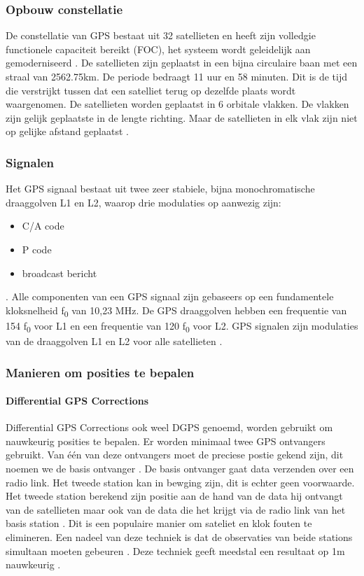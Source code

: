 \subsubsection{Opbouw constellatie}
 De constellatie van GPS bestaat uit 32 satellieten en heeft zijn volledgie functionele capaciteit bereikt (FOC), het systeem wordt geleidelijk aan gemoderniseerd \cite{LBibGNSS4}. De satellieten zijn geplaatst in een bijna circulaire baan met een straal van 2562.75km. De periode bedraagt 11 uur en 58 minuten. Dit is de tijd die verstrijkt tussen dat een satelliet terug op dezelfde plaats wordt waargenomen. De satellieten worden geplaatst in 6 orbitale vlakken. De vlakken zijn gelijk geplaatste in de lengte richting. Maar de satellieten in elk vlak zijn niet op gelijke afstand geplaatst \cite{LBibGNSS6}. 

\subsubsection{Signalen}
Het GPS signaal bestaat uit twee zeer stabiele, bijna monochromatische draaggolven L1 en L2, waarop drie modulaties op aanwezig zijn:
\begin{itemize}
	\item C/A code
	\item P code
	\item broadcast bericht
\end{itemize}. 
Alle componenten van een GPS signaal zijn gebaseers op een fundamentele kloksnelheid f\textsubscript{0} van 10,23 MHz. De GPS draaggolven hebben een frequentie van 154 f\textsubscript{0} voor L1 en een frequentie van 120 f\textsubscript{0} voor L2\cite{LBibGPS2}. GPS signalen zijn modulaties van de draaggolven L1 en L2 voor alle satellieten \cite{LBibGPS3}.

\subsubsection{Manieren om posities te bepalen}
\paragraph{Differential GPS Corrections}
Differential GPS Corrections ook weel DGPS genoemd, worden gebruikt om nauwkeurig posities  te bepalen. Er worden minimaal twee GPS ontvangers gebruikt. Van \'e\'en van deze ontvangers moet de preciese postie gekend zijn, dit noemen we de basis ontvanger \cite{LBibGNSS2,LBibRTK}. De basis ontvanger gaat data verzenden over een radio link.  Het tweede station kan in bewging zijn, dit is echter geen voorwaarde. Het tweede station berekend zijn positie aan de hand van de data hij ontvangt van de satellieten maar ook van de data die het krijgt via de radio link van het basis station \cite{LBibRTK}. Dit is een populaire manier om sateliet en klok fouten te elimineren. Een nadeel van deze techniek is dat de observaties van beide stations simultaan moeten gebeuren \cite{LBibGNSS2}. Deze techniek geeft meedstal een resultaat op 1m nauwkeurig \cite{LBibRTK}.

